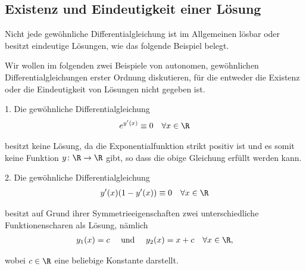 \documentclass[letterpaper,10pt,english]{jupyterBook}
\begin{document}
\subsection{Existenz und Eindeutigkeit einer Lösung}
\label{\detokenize{ode/repetition:existenz-und-eindeutigkeit-einer-losung}}
\par
Nicht jede gewöhnliche Differentialgleichung ist im Allgemeinen lösbar oder besitzt eindeutige Lösungen, wie das folgende Beispiel belegt.
\label{ode/repetition:example-7}
\begin{example}{}{}



\par
Wir wollen im folgenden zwei Beispiele von autonomen, gewöhnlichen Differentialgleichungen erster Ordnung diskutieren, für die entweder die Existenz oder die Eindeutigkeit von Lösungen nicht gegeben ist.

\par
1. Die gewöhnliche Differentialgleichung
\begin{align*}
e^{y'(x)} \equiv 0 \quad \forall x \in \R
\end{align*}
\par
besitzt keine Lösung, da die Exponentialfunktion strikt positiv ist und es somit keine Funktion \(y \colon \R \rightarrow \R\) gibt, so dass die obige Gleichung erfüllt werden kann.

\par
2. Die gewöhnliche Differentialgleichung
\begin{align*}
y'(x)(1-y'(x)) \equiv 0 \quad \forall x \in \R
\end{align*}
\par
besitzt auf Grund ihrer Symmetrieeigenschaften zwei unterschiedliche Funktionenscharen als Lösung, nämlich
\begin{align*}
y_1(x) = c \quad \text{ und } \quad y_2(x) = x + c \quad \forall x \in \R,
\end{align*}
\par
wobei \(c \in \R\) eine beliebige Konstante darstellt.
\end{example}
\end{document}

